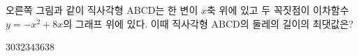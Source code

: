 \noindent\begin{minipage}[t]{0.58\linewidth}\vspace{0pt}\raggedright 오른쪽 그림과 같이 직사각형 $\mathrm{ABCD}$는 한 변이 $x$축 위에 있고 두 꼭짓점이 이차함수 $y=-x^2+8x$의 그래프 위에 있다. 이때 직사각형 $\mathrm{ABCD}$의 둘레의 길이의 최댓값은? \end{minipage}\hfill\begin{minipage}[t]{0.4\linewidth}\vspace{0pt}\centering \resizebox{\ifdim\width>\linewidth\linewidth\else\width\fi}{!}{}\end{minipage}\par
\begin{choices32}{$30$}{$32$}{$34$}{$36$}{$38$}\end{choices32}
